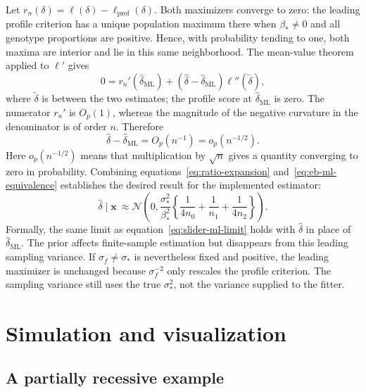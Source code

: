 \documentclass[11pt]{article}
\newcommand{\Normal}{\mathcal{N}}
\begin{document}
Let $r_n(\delta)=\ell(\delta)-\ell_{\mathrm{prof}}(\delta)$.
Both maximizers converge to zero: the leading profile criterion
has a unique population maximum there when $\beta_*\neq0$ and
all genotype proportions are positive. Hence, with probability
tending to one, both maxima are interior and lie in this same
neighborhood. The mean-value theorem applied to $\ell'$ gives
\begin{equation}
0=r_n'(\widehat\delta_{\mathrm{ML}})
 +(\widehat\delta-\widehat\delta_{\mathrm{ML}})\ell''(\tilde\delta),
\label{eq:eb-ml-score-comparison}
\end{equation}
where $\tilde\delta$ is between the two estimates; the profile
score at $\widehat\delta_{\mathrm{ML}}$ is zero. The numerator
$r_n'$ is $O_p(1)$, whereas the magnitude of the negative curvature
in the denominator is of order $n$. Therefore
\begin{equation}
\widehat\delta-\widehat\delta_{\mathrm{ML}}=O_p(n^{-1})
 =o_p(n^{-1/2}).
\label{eq:eb-ml-equivalence}
\end{equation}
Here $o_p(n^{-1/2})$ means that multiplication by $\sqrt n$
gives a quantity converging to zero in probability. Combining
equations~\eqref{eq:ratio-expansion} and~\eqref{eq:eb-ml-equivalence}
establishes the desired result for the implemented estimator:
\begin{equation}
\boxed{\quad
\widehat\delta\mid\mathbf x\ \approx
\Normal\!\left(0,
 \frac{\sigma_*^2}{\beta_*^2}
 \left\{\frac1{4n_0}+\frac1{n_1}+\frac1{4n_2}\right\}\right).
\quad}
\label{eq:eb-slider-null-law}
\end{equation}
Formally, the same limit as equation~\eqref{eq:slider-ml-limit}
holds with $\widehat\delta$ in place of
$\widehat\delta_{\mathrm{ML}}$. The prior affects finite-sample
estimation but disappears from this leading sampling variance.
If $\sigma_f\neq\sigma_*$ is nevertheless fixed and positive,
the leading maximizer is unchanged because $\sigma_f^{-2}$ only
rescales the profile criterion. The sampling variance still uses
the true $\sigma_*^2$, not the variance supplied to the fitter.

\section{Simulation and visualization}

\subsection{A partially recessive example}
\end{document}
